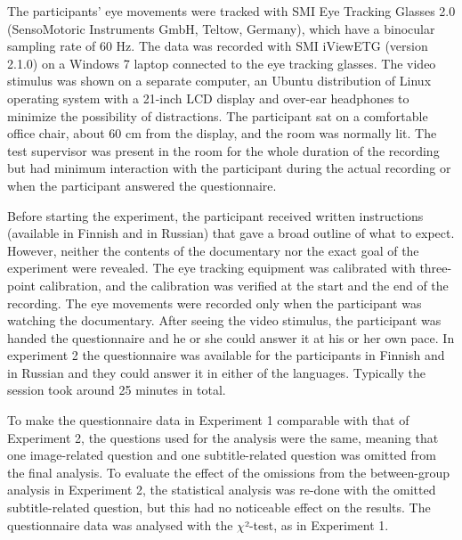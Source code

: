 \documentclass[output=paper]{langsci/langscibook}
\begin{document}
The participants’ eye movements were tracked with SMI Eye Tracking Glasses 2.0 (SensoMotoric Instruments GmbH, Teltow, Germany), which have a binocular sampling rate of 60 Hz. The data was recorded with SMI iViewETG (version 2.1.0) on a Windows 7 laptop connected to the eye tracking glasses. The video stimulus was shown on a separate computer, an Ubuntu distribution of Linux operating system with a 21-inch LCD display and over-ear headphones to minimize the possibility of distractions. The participant sat on a comfortable office chair, about 60 cm from the display, and the room was normally lit. The test supervisor was present in the room for the whole duration of the recording but had minimum interaction with the participant during the actual recording or when the participant answered the questionnaire. 

Before starting the experiment, the participant received written instructions (available in Finnish and in Russian) that gave a broad outline of what to expect. However, neither the contents of the documentary nor the exact goal of the experiment were revealed. The eye tracking equipment was calibrated with three-point calibration, and the calibration was verified at the start and the end of the recording. The eye movements were recorded only when the participant was watching the documentary. After seeing the video stimulus, the participant was handed the questionnaire and he or she could answer it at his or her own pace. In experiment 2 the questionnaire was available for the participants in Finnish and in Russian and they could answer it in either of the languages. Typically the session took around 25 minutes in total.

To make the questionnaire data in Experiment 1 comparable with that of Experiment 2, the questions used for the analysis were the same, meaning that one image-related question and one subtitle-related question was omitted from the final analysis. To evaluate the effect of the omissions from the between-group analysis in Experiment 2, the statistical analysis was re-done with the omitted subtitle-related question, but this had no noticeable effect on the results. The questionnaire data was analysed with the $\chi $²-test, as in Experiment 1.
\end{document}
